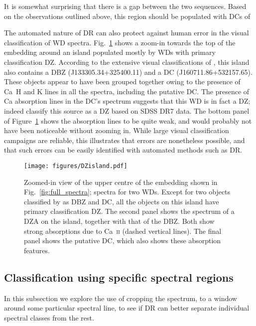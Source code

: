 \documentclass[fleqn,usenatbib]{mnras}
\begin{document}
It is somewhat surprising that there is a gap between the two sequences.
Based on the observations outlined above, this region should be populated with DCs of 

The automated nature of DR can also protect against human error in the visual classification of WD spectra.
Fig.~\ref{fig:DZisland} shows a zoom-in towards the top of the embedding around an island populated mostly by WDs with primary classification DZ.
According to the extensive visual classifications of \citet{manser24}, this island also contains a DBZ (J133305.34+325400.11) and a DC (J160711.86+532157.65).
These objects appear to have been grouped together owing to the presence of Ca~H and K lines in all the spectra, including the putative DC.
The presence of Ca absorption lines in the DC's spectrum suggests that this WD is in fact a DZ; indeed \citet{kleinman13} classify this source as a DZ based on SDSS DR7 data.
The bottom panel of Figure~\ref{fig:DZisland} shows the absorption lines to be quite weak, and would probably not have been noticeable without zooming in.
While large visual classification campaigns are reliable, this illustrates that errors are nonetheless possible, and that such errors can be easily identified with automated methods such as DR.

\begin{figure}
\texttt{[image: figures/DZisland.pdf]}
\caption{
    Zoomed-in view of the upper centre of the embedding shown in Fig.~\ref{fig:full_spectra}; spectra for two WDs.
    Except for two objects classified by \citet{manser24} as DBZ and DC, all the objects on this island have primary classification DZ.
    The second panel shows the spectrum of a DZA on the island, together with that of the DBZ.
    Both show strong absorptions due to Ca~\textsc{ii} (dashed vertical lines).
    The final panel shows the putative DC, which also shows these absorption features.
}
\label{fig:DZisland}
\end{figure}

\subsection{Classification using specific spectral regions}
\label{sec:zoom}

In this subsection we explore the use of cropping the spectrum, to a window around some particular spectral line, to see if DR can better separate individual spectral classes from the rest.
\end{document}
